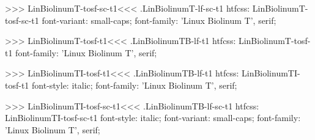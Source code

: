 {{{{{{{>>>
\<LinBiolinumT-tosf-sc-t1\><<<
.LinBiolinumT-lf-sc-t1
htfcss:  LinBiolinumT-tosf-sc-t1  font-variant: small-caps; font-family: 'Linux Biolinum T', serif;

>>>
\<LinBiolinumT-tosf-t1\><<<
.LinBiolinumTB-lf-t1
htfcss:  LinBiolinumT-tosf-t1  font-family: 'Linux Biolinum T', serif;

>>>
\<LinBiolinumTI-tosf-t1\><<<
.LinBiolinumTB-lf-t1
htfcss:  LinBiolinumTI-tosf-t1  font-style: italic; font-family: 'Linux Biolinum T', serif;

>>>
\<LinBiolinumTI-tosf-sc-t1\><<<
.LinBiolinumTB-lf-sc-t1
htfcss:  LinBiolinumTI-tosf-sc-t1  font-style: italic; font-variant: small-caps; font-family: 'Linux Biolinum T', serif;

}}}}}}}
